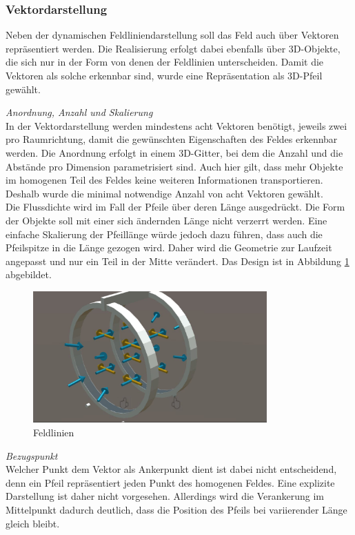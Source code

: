 \subsubsection{Vektordarstellung}
\label{sec-4-4-2}
Neben der dynamischen Feldliniendarstellung soll das Feld auch über Vektoren repräsentiert werden. Die Realisierung erfolgt dabei ebenfalls über 3D-Objekte, die sich nur in der Form von denen der Feldlinien unterscheiden. Damit die Vektoren als solche erkennbar sind, wurde eine Repräsentation als 3D-Pfeil gewählt.
 
\textit{Anordnung, Anzahl und Skalierung}\\
In der Vektordarstellung werden mindestens acht Vektoren benötigt, jeweils zwei pro Raumrichtung, damit die gewünschten Eigenschaften des Feldes erkennbar werden. Die Anordnung erfolgt in einem 3D-Gitter, bei dem die Anzahl und die Abstände pro Dimension parametrisiert sind. Auch hier gilt, dass mehr Objekte im homogenen Teil des Feldes keine weiteren Informationen transportieren. Deshalb wurde die minimal notwendige Anzahl von acht Vektoren gewählt.\\
\noindent\hspace*{5mm}
Die Flussdichte wird im Fall der Pfeile über deren Länge ausgedrückt. Die Form der Objekte soll mit einer sich ändernden Länge nicht verzerrt werden. Eine einfache Skalierung der Pfeillänge würde jedoch dazu führen, dass auch die Pfeilspitze in die Länge gezogen wird. Daher wird die Geometrie zur Laufzeit angepasst und nur ein Teil in der Mitte verändert. Das Design ist in Abbildung \ref{img:mfield-vectors} abgebildet.\\

\begin{figure}[h!]
	\centering
	\includegraphics[width=0.8\textwidth]{images/unity/vector.jpg}
	\caption{Feldlinien}
	\label{img:mfield-vectors}
\end{figure}

\textit{Bezugspunkt}\\
Welcher Punkt dem Vektor als Ankerpunkt dient ist dabei nicht entscheidend, denn ein Pfeil repräsentiert jeden Punkt des homogenen Feldes. Eine explizite Darstellung ist daher nicht vorgesehen. Allerdings wird die Verankerung im Mittelpunkt dadurch deutlich, dass die Position des Pfeils bei variierender Länge gleich bleibt.\\

